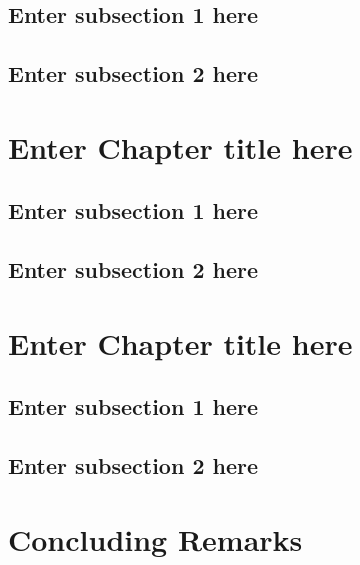\documentclass[
]{book}
\begin{document}
\hypertarget{enter-subsection-1-here-8}{%
\section{Enter subsection 1 here}\label{enter-subsection-1-here-8}}

\hypertarget{enter-subsection-2-here-8}{%
\section{Enter subsection 2 here}\label{enter-subsection-2-here-8}}

\hypertarget{ch11}{%
\chapter{Enter Chapter title here}\label{ch11}}

\hypertarget{enter-subsection-1-here-9}{%
\section{Enter subsection 1 here}\label{enter-subsection-1-here-9}}

\hypertarget{enter-subsection-2-here-9}{%
\section{Enter subsection 2 here}\label{enter-subsection-2-here-9}}

\hypertarget{ch12}{%
\chapter{Enter Chapter title here}\label{ch12}}

\hypertarget{enter-subsection-1-here-10}{%
\section{Enter subsection 1 here}\label{enter-subsection-1-here-10}}

\hypertarget{enter-subsection-2-here-10}{%
\section{Enter subsection 2 here}\label{enter-subsection-2-here-10}}

\hypertarget{concluding-remarks}{%
\chapter*{Concluding Remarks}\label{concluding-remarks}}
\end{document}
